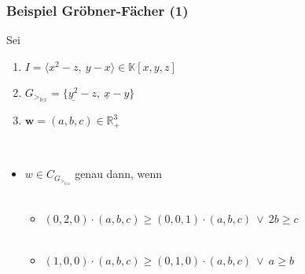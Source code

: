 \documentclass{beamer}
\begin{document}
\begin{frame}[<+->][fragile]
\frametitle{Beispiel Gröbner-Fächer (1)}
 Sei 
 \begin{enumerate}
 \item $I = \langle x^{2}-z,~y-x  \rangle \in \mathbb{K}\left[x,y,z\right]  $
 \item $G_{>_{lex}} = \{ \underline{y^{2}}-z,~\underline{x}-y  \} $ 
 \item $\textbf{w}= (a,b,c) \in \mathbb{R}^{3}_{+} $
\end{enumerate}
 
~\\
\begin{itemize}
\item $w \in C_{G_{>_{lex}}}$ genau dann, wenn 
~\\
~\\
\begin{itemize}
\item $ \left(0,2,0\right) \cdot \left(a,b,c\right) \geq \left(0,0,1\right) \cdot  \left(a,b,c\right) ~ \vee ~ 2b \geq c  $
~\\
~\\
\item
$ \left(1,0,0\right) \cdot \left(a,b,c\right) \geq \left(0,1,0\right) \cdot  \left(a,b,c\right) ~ \vee ~ a \geq b  $
\end{itemize}
\end{itemize}

\end{frame}
\end{document}
